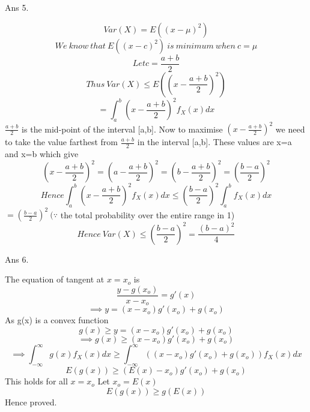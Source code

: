 \documentclass[11pt]{article}
\begin{document}
Ans 5.\begin{center}
$$Var(X) = E((x-\mu)^2)$$
$$We\ know\ that\ E((x-c)^2)\ is\ minimum\ when\ c = \mu$$
$$Let c = \frac{a+b}{2}$$
$$Thus\ Var(X) \le E((x-\frac{a+b}{2})^2)$$
$$=\int_{a}^{b}(x - \frac{a+b}{2})^2 f_X(x) dx$$
$\frac{a+b}{2}$ is the mid-point of the interval [a,b].
Now to maximise $(x - \frac{a+b}{2})^2$ we need to take the value farthest from $\frac{a+b}{2}$ in the interval [a,b]. These values are x=a and x=b which give
$$(x - \frac{a+b}{2})^2 = (a - \frac{a+b}{2})^2 = (b - \frac{a+b}{2})^2 = (\frac{b-a}{2})^2$$
$$Hence \int_{a}^{b}(x - \frac{a+b}{2})^2 f_X(x) dx \le (\frac{b-a}{2})^2 \int_{a}^{b} f_X(x) dx$$
$=(\frac{b-a}{2})^2\ (\because$ the total probability over the entire range in 1)
$$Hence\ Var(X) \le (\frac{b-a}{2})^2=\frac{(b-a)^2}{4}$$
\newline
\newline
\end{center}

Ans 6.\begin{center}
The equation of tangent at $x=x_o$ is
$$\frac{y-g(x_o)}{x-x_o} = g'(x)$$
$$\implies y=(x-x_o)g'(x_o)+g(x_o)$$
As g(x) is a convex function
$$g(x) \ge y=(x-x_o)g'(x_o)+g(x_o)$$
$$\implies g(x) \ge (x-x_o)g'(x_o) + g(x_o)$$
$$\implies \int_{-\infty}^{\infty}g(x)f_X(x)dx \ge \int_{-\infty}^{\infty}((x-x_o)g'(x_o) + g(x_o))f_X(x)dx$$
$$E(g(x)) \ge (E(x) - x_o)g'(x_o) + g(x_o)$$
This holds for all $x=x_o$
Let $x_o=E(x)$
$$E(g(x)) \ge g(E(x))$$
Hence proved.
\end{center}
\end{document}
